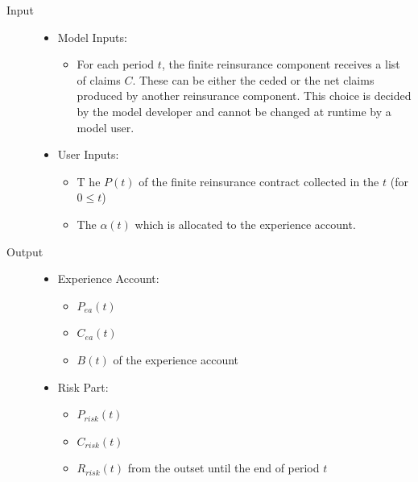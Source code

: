 \begin{description}
	\item[Input] \hfill
		\begin{itemize}%
			\item[] Model Inputs:
			\begin{itemize}%
				\item[] For each period $t$, the finite reinsurance component receives a list of claims $C$. These can be either the ceded or the net claims produced by another reinsurance component. This choice is decided by the model developer and cannot be changed at runtime by a model user.
			\end{itemize}
			\item[] User Inputs:
			\begin{itemize}%
				\item[] T	he  $P(t)$ of the finite reinsurance contract collected in the  $t$ (for $0 \leq t$)
				\item[] The  $\alpha(t)$ which is allocated to the experience account. 
			\end{itemize}
		\end{itemize}
	\item[Output] \hfill
		\begin{itemize}%
			\item[] Experience Account:
			\begin{itemize}%
				\item[]  $P_{ea}(t)$
				\item[]  $C_{ea}(t)$
				\item[]  $B(t)$ of the experience account
			\end{itemize}
			\item[] Risk Part:
			\begin{itemize}%
				\item[]  $P_{risk}(t)$
				\item[]  $C_{risk}(t)$
				\item[]  $R_{risk}(t)$ from the outset until the end of period $t$
			\end{itemize}

\end{itemize}
\end{description}
